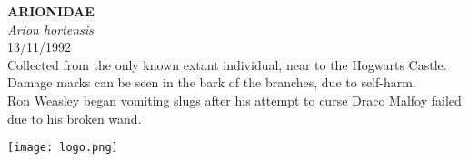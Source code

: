 \documentclass[
  landscape]{article}
\begin{document}
\begin{mdframed}[linecolor=mycolortext, linewidth=2pt, backgroundcolor=mycolor]

  \bigskip
  \begin{flushright}
  \begin{minipage}[t][-50ex][t]{16em}  
  \end{minipage}
  \end{flushright}
  \bigskip
  \begin{adjustwidth}{1cm}{1cm}
  {\fontsize{50pt}{0pt}\selectfont\bf\textcolor{mycolortext}{ ARIONIDAE }} \\
  \linebreak
  \linebreak
  {\fontsize{40pt}{100pt}\selectfont\textcolor{mycolortext}{\emph{ Arion hortensis }}} \\
  \vfill
  {\fontsize{30pt}{100pt}\selectfont\textcolor{mycolortext}{ 13/11/1992 }} \\
  \vfill
  {\fontsize{30pt}{100pt}\selectfont\textcolor{mycolortext}{ Collected from the only known extant individual, near to the Hogwarts Castle. Damage marks can be seen in the bark of the branches, due to self-harm. }} \\
  \vfill
  {\fontsize{30pt}{50pt}\selectfont\textcolor{mycolortext}{ Ron Weasley began vomiting slugs after his attempt to curse Draco Malfoy failed due to his broken wand. }} \\
  \end{adjustwidth}
  \begin{center}
  \texttt{[image: logo.png]}
  \end{center}
  \end{mdframed}
  \pagebreak

\end{document}
